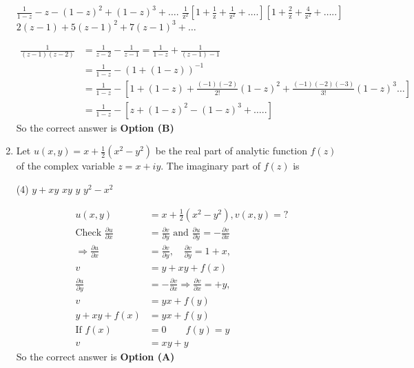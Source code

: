 \begin{enumerate}[label=\color{ocre}\textbf{\arabic*.}]
\begin{tasks}
		\task[\textbf{B.}] $\frac{1}{1-z}-z-(1-z)^{2}+(1-z)^{3}+\ldots .$
		\task[\textbf{C.}] $\frac{1}{\mathrm{z}^{2}}\left[1+\frac{1}{\mathrm{z}}+\frac{1}{\mathrm{z}^{2}}+\ldots .\right]\left[1+\frac{2}{\mathrm{z}}+\frac{4}{\mathrm{z}^{2}}+\ldots . .\right]$
		\task[\textbf{D.}]  $2(z-1)+5(z-1)^{2}+7(z-1)^{3}+\ldots$
	\end{tasks}
	\begin{answer}
		\begin{align*}
		\frac{1}{(z-1)(z-2)}&=\frac{1}{z-2}-\frac{1}{z-1}=\frac{1}{1-z}+\frac{1}{(z-1)-1}\\&=\frac{1}{1-z}-(1+(1-z))^{-1}\\
		&=\frac{1}{1-z}-\left[1+(1-z)+\frac{(-1)(-2)}{2 !}(1-z)^{2}+\frac{(-1)(-2)(-3)}{3 !}(1-z)^{3} \ldots\right]\\
		&=\frac{1}{1-z}-\left[z+(1-z)^{2}-(1-z)^{3}+\ldots . .\right]
		\end{align*}
		So the correct answer is \textbf{Option (B)}
	\end{answer}
	\item Let $u(x, y)=x+\frac{1}{2}\left(x^{2}-y^{2}\right)$ be the real part of analytic function $f(z)$ of the complex variable $z=x+i y$. The imaginary part of $f(z)$ is
	{}
	\begin{tasks}(4)
		\task[\textbf{A.}] $y+x y$
		\task[\textbf{B.}] $x y$
		\task[\textbf{C.}] $y$
		\task[\textbf{D.}] $y^{2}-x^{2}$
	\end{tasks}
	\begin{answer}
		\begin{align*}
		u(x, y)&=x+\frac{1}{2}\left(x^{2}-y^{2}\right), v(x, y)=?\\
		\text{Check }\frac{\partial u}{\partial x}&=\frac{\partial v}{\partial y}\text{ and } \frac{\partial u}{\partial y}=-\frac{\partial v}{\partial x}\\
		\Rightarrow \frac{\partial u}{\partial x}&=\frac{\partial v}{\partial y}, \quad \frac{\partial v}{\partial y}=1+x, \\ v&=y+x y+f(x)\\
		\frac{\partial u}{\partial y}&=-\frac{\partial v}{\partial x} \Rightarrow \frac{\partial v}{\partial x}=+y, \\ v&=y x+f(y)\\
		y+x y+f(x)&=y x+f(y)\\
		\text{If }f(x)&=0\quad \quad
		f(y)=y\\
		v&=x y+y
		\end{align*}
		So the correct answer is \textbf{Option (A)}

\end{answer}
\end{enumerate}
